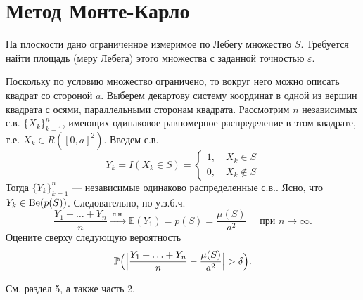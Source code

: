 \section{Метод Монте-Карло}
\label{MK}

\begin{problem}
На плоскости дано ограниченное измеримое по Лебегу множество $S$. Требуется найти площадь (меру Лебега) этого множества с заданной точностью 
$\varepsilon$. 

Поскольку по условию множество ограничено, то вокруг него можно описать квадрат со стороной $a$. Выберем декартову систему координат 
в одной из вершин квадрата с осями, параллельными сторонам квадрата. Рассмотрим $n$  независимых с.в. $\{ X_k\}_{k=1}^{n}$,  имеющих 
одинаковое равномерное распределение в этом квадрате, т.е. $X_k\in R([0,a]^2)$. Введем с.в. 
$$
Y_k=I(X_k\in S)=\begin{cases}
1,\quad X_k\in S\\
0, \quad X_k\notin S
\end{cases} 
$$
Тогда $\{ Y_k\}_{k=1}^{n}$ --- независимые одинаково распределенные с.в.. Ясно, что $Y_k\in\mathrm{Be}(p(S))$. Следовательно, по у.з.б.ч. 
$$
\frac{Y_1+\ldots+Y_n}{n} \xrightarrow{\text{ п.н. }} {\mathbb E}(Y_1)=p(S)=\frac{\mu(S)}{a^2} \quad \text{ при  } n\to\infty . 
$$
Оцените сверху следующую вероятность
$$
{\mathbb P}\Bigl( \Bigl| \frac{Y_1+\ldots+Y_n}{n}-\frac{\mu(S)}{a^2}\Bigr|>\delta \Bigr) . 
$$
\end{problem}

\begin{ordre}
См. раздел 5, а также часть 2.
\end{ordre}


